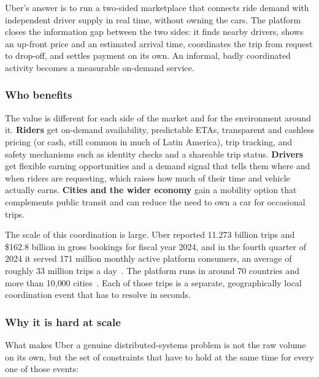 Uber's answer is to run a two-sided marketplace that connects ride demand
with independent driver supply in real time, without owning the cars. The
platform closes the information gap between the two sides: it finds nearby
drivers, shows an up-front price and an estimated arrival time, coordinates
the trip from request to drop-off, and settles payment on its own. An
informal, badly coordinated activity becomes a measurable on-demand service.

\subsubsection*{Who benefits}

The value is different for each side of the market and for the environment
around it. \textbf{Riders} get on-demand availability, predictable ETAs,
transparent and cashless pricing (or cash, still common in much of Latin
America), trip tracking, and safety mechanisms such as identity checks and a
shareable trip status. \textbf{Drivers} get flexible earning opportunities
and a demand signal that tells them where and when riders are requesting,
which raises how much of their time and vehicle actually earns.
\textbf{Cities and the wider economy} gain a mobility option that complements
public transit and can reduce the need to own a car for occasional trips.

The scale of this coordination is large. Uber reported 11.273 billion trips
and \$162.8 billion in gross bookings for fiscal year 2024, and in the fourth
quarter of 2024 it served 171 million monthly active platform consumers, an
average of roughly 33 million trips a day~\cite{uber2024fy}. The platform
runs in around 70 countries and more than 10{,}000 cities~\cite{uberH3}. Each
of those trips is a separate, geographically local coordination event that
has to resolve in seconds.

\subsubsection*{Why it is hard at scale}

What makes Uber a genuine distributed-systems problem is not the raw volume
on its own, but the set of constraints that have to hold at the same time for
every one of those events:

